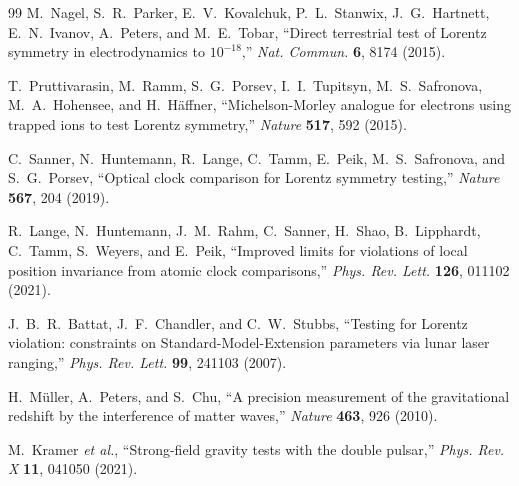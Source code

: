 \documentclass[a4paper,fleqn]{cas-dc}
\theoremstyle{thmstyleone}%
\theoremstyle{thmstyletwo}%
\begin{document}
\begin{thebibliography}{99}
M.~Nagel, S.~R.~Parker, E.~V.~Kovalchuk, P.~L.~Stanwix,
J.~G.~Hartnett, E.~N.~Ivanov, A.~Peters, and M.~E.~Tobar,
``Direct terrestrial test of Lorentz symmetry in
electrodynamics to $10^{-18}$,''
\textit{Nat. Commun.} \textbf{6}, 8174 (2015).

T.~Pruttivarasin, M.~Ramm, S.~G.~Porsev, I.~I.~Tupitsyn,
M.~S.~Safronova, M.~A.~Hohensee, and H.~H\"affner,
``Michelson-Morley analogue for electrons using trapped
ions to test Lorentz symmetry,''
\textit{Nature} \textbf{517}, 592 (2015).

C.~Sanner, N.~Huntemann, R.~Lange, C.~Tamm, E.~Peik,
M.~S.~Safronova, and S.~G.~Porsev,
``Optical clock comparison for Lorentz symmetry testing,''
\textit{Nature} \textbf{567}, 204 (2019).

R.~Lange, N.~Huntemann, J.~M.~Rahm, C.~Sanner, H.~Shao,
B.~Lipphardt, C.~Tamm, S.~Weyers, and E.~Peik,
``Improved limits for violations of local position invariance
from atomic clock comparisons,''
\textit{Phys. Rev. Lett.} \textbf{126}, 011102 (2021).

J.~B.~R.~Battat, J.~F.~Chandler, and C.~W.~Stubbs,
``Testing for Lorentz violation: constraints on
Standard-Model-Extension parameters via lunar laser
ranging,''
\textit{Phys. Rev. Lett.} \textbf{99}, 241103 (2007).

H.~M\"uller, A.~Peters, and S.~Chu,
``A precision measurement of the gravitational redshift by
the interference of matter waves,''
\textit{Nature} \textbf{463}, 926 (2010).

M.~Kramer \textit{et al.},
``Strong-field gravity tests with the double pulsar,''
\textit{Phys. Rev. X} \textbf{11}, 041050 (2021).

\end{thebibliography}
\end{document}
